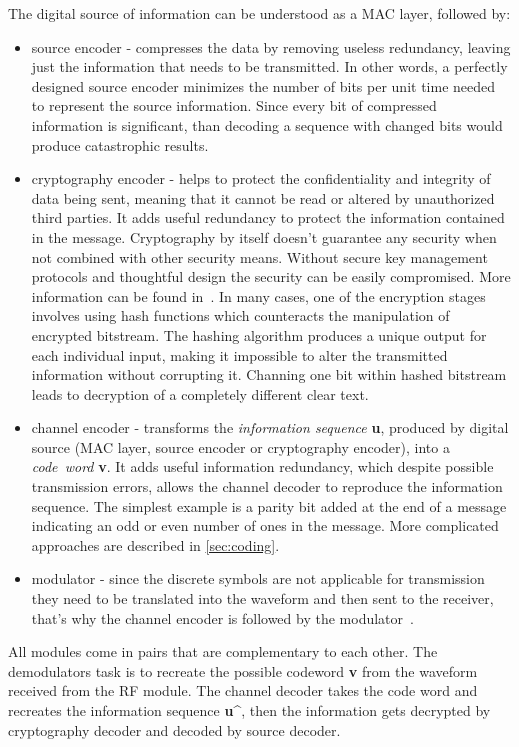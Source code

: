 \documentclass[]{myclass}
\begin{document}
The digital source of information can be understood as a MAC layer, followed by:
\begin{itemize}
    \item source encoder - compresses the data by removing useless redundancy, leaving just the information that needs to be transmitted. In other words, a perfectly designed source encoder minimizes the number of bits per unit time needed to represent the source information. Since every bit of compressed information is significant, than decoding a sequence with changed bits would produce catastrophic results.
    \item cryptography encoder - helps to protect the confidentiality and integrity of data being sent, meaning that it cannot be read or altered by unauthorized third parties. It adds useful redundancy to protect the information contained in the message. Cryptography by itself doesn't guarantee any security when not combined with other security means. Without secure key management protocols and thoughtful design the security can be easily compromised. More information can be found in~\cite{Cryptography}. In many cases, one of the encryption stages involves using hash functions which counteracts the manipulation of encrypted bitstream. The hashing algorithm produces a unique output for each individual input, making it impossible to alter the transmitted information without corrupting it. Channing one bit within hashed bitstream leads to decryption of a completely different clear text.
    \item channel encoder - transforms the \textit{information sequence} \textbf{u}, produced by digital source (MAC layer, source encoder or cryptography encoder), into a \textit{code~word} \textbf{v}. It adds useful information redundancy, which despite possible transmission errors, allows the channel decoder to reproduce the information sequence. The simplest example is a parity bit added at the end of a message indicating an odd or even number of ones in the message. More complicated approaches are described in \autoref{sec:coding}.
    \item modulator - since the discrete symbols are not applicable for transmission they need to be translated into the waveform and then sent to the receiver, that's why the channel encoder is followed by the modulator~\cite{book:LinCostello}.
\end{itemize}
All modules come in pairs that are complementary to each other. The demodulators task is to recreate the possible codeword \textbf{v} from the waveform received from the RF module. The channel decoder takes the code word and recreates the information sequence \textbf{u\^}, then the information gets decrypted by cryptography decoder and decoded by source decoder.
\end{document}
